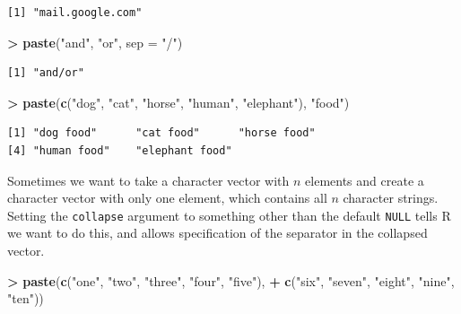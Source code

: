 \documentclass[
]{krantz}
\makeatletter
\newenvironment{Shaded}{\begin{snugshade}}{\end{snugshade}}
\newcommand{\DataTypeTok}[1]{\textcolor[rgb]{0.27,0.27,0.27}{#1}}
\newcommand{\KeywordTok}[1]{\textcolor[rgb]{0.27,0.27,0.27}{\textbf{#1}}}
\newcommand{\NormalTok}[1]{#1}
\newcommand{\OperatorTok}[1]{\textcolor[rgb]{0.43,0.43,0.43}{\textbf{#1}}}
\newcommand{\StringTok}[1]{\textcolor[rgb]{0.5,0.5,0.5}{#1}}
\newenvironment{kframe}{%
\medskip{}
\setlength{\fboxsep}{.8em}
 \def\at@end@of@kframe{}%
 \ifinner\ifhmode%
  \def\at@end@of@kframe{\end{minipage}}%
  \begin{minipage}{\columnwidth}%
 \fi\fi%
 \def\FrameCommand##1{\hskip\@totalleftmargin \hskip-\fboxsep
 \colorbox{shadecolor}{##1}\hskip-\fboxsep
     \hskip-\linewidth \hskip-\@totalleftmargin \hskip\columnwidth}%
 \MakeFramed {\advance\hsize-\width
   \@totalleftmargin\z@ \linewidth\hsize
   \@setminipage}}%
 {\par\unskip\endMakeFramed%
 \at@end@of@kframe}
\renewenvironment{Shaded}{\begin{kframe}}{\end{kframe}}
\makeatother
\begin{document}
\begin{verbatim}
[1] "mail.google.com"
\end{verbatim}

\begin{Shaded}
\begin{Highlighting}[]
\OperatorTok{\textgreater{}}\StringTok{ }\KeywordTok{paste}\NormalTok{(}\StringTok{"and"}\NormalTok{, }\StringTok{"or"}\NormalTok{, }\DataTypeTok{sep =} \StringTok{"/"}\NormalTok{)}
\end{Highlighting}
\end{Shaded}

\begin{verbatim}
[1] "and/or"
\end{verbatim}

\begin{Shaded}
\begin{Highlighting}[]
\OperatorTok{\textgreater{}}\StringTok{ }\KeywordTok{paste}\NormalTok{(}\KeywordTok{c}\NormalTok{(}\StringTok{"dog"}\NormalTok{, }\StringTok{"cat"}\NormalTok{, }\StringTok{"horse"}\NormalTok{, }\StringTok{"human"}\NormalTok{, }\StringTok{"elephant"}\NormalTok{), }\StringTok{"food"}\NormalTok{)}
\end{Highlighting}
\end{Shaded}

\begin{verbatim}
[1] "dog food"      "cat food"      "horse food"   
[4] "human food"    "elephant food"
\end{verbatim}

Sometimes we want to take a character vector with \(n\) elements and create a character vector with only one element, which contains all \(n\) character strings. Setting the \texttt{collapse} argument to something other than the default \texttt{NULL} tells R we want to do this, and allows specification of the separator in the collapsed vector.

\begin{Shaded}
\begin{Highlighting}[]
\OperatorTok{\textgreater{}}\StringTok{ }\KeywordTok{paste}\NormalTok{(}\KeywordTok{c}\NormalTok{(}\StringTok{"one"}\NormalTok{, }\StringTok{"two"}\NormalTok{, }\StringTok{"three"}\NormalTok{, }\StringTok{"four"}\NormalTok{, }\StringTok{"five"}\NormalTok{), }
\OperatorTok{+}\StringTok{       }\KeywordTok{c}\NormalTok{(}\StringTok{"six"}\NormalTok{, }\StringTok{"seven"}\NormalTok{, }\StringTok{"eight"}\NormalTok{, }\StringTok{"nine"}\NormalTok{, }\StringTok{"ten"}\NormalTok{))}
\end{Highlighting}
\end{Shaded}
\end{document}
